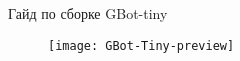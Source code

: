 \begin{titlepage}
    \begin{center}
        Гайд по сборке GBot-tiny
    \end{center}
    
    \begin{figure}[H]
        \centering
        \texttt{[image: GBot-Tiny-preview]}
        \label{gbot-tiny-preview}
    \end{figure}
    
\end{titlepage}